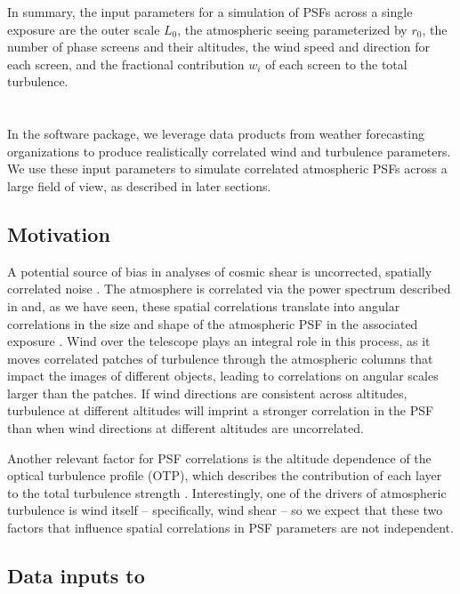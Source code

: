 \documentclass[twocolumn,twocolappendix]{openjournal}
\begin{document}
In summary, the input parameters for a simulation of PSFs across a single exposure are the outer scale $L_0$, the atmospheric seeing parameterized by $r_0$, the number of phase screens and their altitudes, the wind speed and direction for each screen, and the fractional contribution $w_i$ of each screen to the total turbulence. 

\section{\psfws} \label{sec:psfws}

In the \psfws software package, we leverage data products from weather forecasting organizations to produce realistically correlated wind and turbulence parameters. 
We use these input parameters to simulate correlated atmospheric PSFs across a large field of view, as described in later sections. 

\subsection{Motivation}
A potential source of bias in analyses of cosmic shear is uncorrected, spatially correlated noise \citep{mandelbaum_weak_2018}. 
The atmosphere is correlated via the \vk power spectrum described in  and, as we have seen, these spatial correlations translate into angular correlations in the size and shape of the atmospheric PSF in the associated exposure \citep{heymans_impact_2012, jarvis_dark_2020}.
Wind over the telescope plays an integral role in this process, as it moves correlated patches of turbulence through the atmospheric columns that  impact the images of different objects, leading to correlations on angular scales larger than the patches. 
If wind directions are consistent across altitudes, turbulence at different altitudes will imprint a stronger correlation in the PSF than when wind directions at different altitudes are uncorrelated. 

Another relevant factor for PSF correlations is the altitude dependence of the optical turbulence profile (OTP), which describes the contribution of each layer to the total turbulence strength \citep{roddier_v_1981}.
Interestingly, one of the drivers of atmospheric turbulence is wind itself -- specifically, wind shear \citep{masciadri_optical_2017}-- so we expect that these two factors that influence spatial correlations in PSF parameters are not independent.


\subsection{Data inputs to \psfws} \label{sec:inputs}
\end{document}
